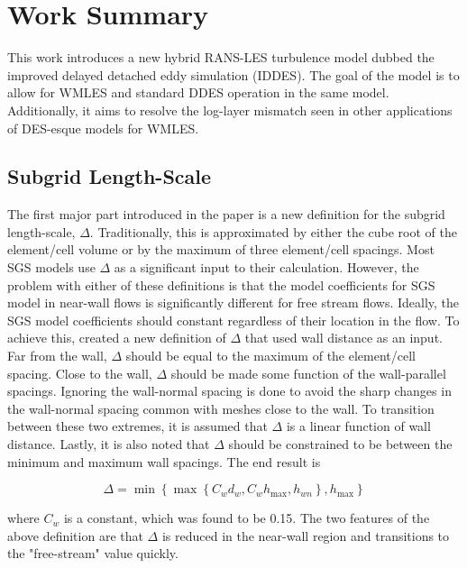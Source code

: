 \documentclass{ucb}
\begin{document}
\section{Work Summary}
This work introduces a new hybrid RANS-LES turbulence model dubbed the improved delayed detached eddy simulation (IDDES). The goal of the model is to allow for WMLES and standard DDES operation in the same model. Additionally, it aims to resolve the log-layer mismatch seen in other applications of DES-esque models for WMLES.

\subsection{Subgrid Length-Scale}
The first major part introduced in the paper is a new definition for the subgrid length-scale, \(\Delta \). Traditionally, this is approximated by either the cube root of the element/cell volume or by the maximum of three element/cell spacings. Most SGS models use \(\Delta \) as a significant input to their calculation. However, the problem with either of these definitions is that the model coefficients for SGS model in near-wall flows is significantly different for free stream flows. Ideally, the SGS model coefficients should constant regardless of their location in the flow. To achieve this, \citeauthor{shurHybridRANSLESApproach2008} created a new definition of \(\Delta \) that used wall distance as an input. Far from the wall, \(\Delta \) should be equal to the maximum of the element/cell spacing. Close to the wall, \(\Delta \) should be made some function of the wall-parallel spacings. Ignoring the wall-normal spacing is done to avoid the sharp changes in the wall-normal spacing common with meshes close to the wall. To transition between these two extremes, it is assumed that \(\Delta \) is a linear function of wall distance. Lastly, it is also noted that \(\Delta \) should be constrained to be between the minimum and maximum wall spacings. The end result is

\begin{equation}\label{eq:delta}
    \Delta = \min \left \{ 
        \max \left \{ C_w d_w, C_w h_{\max}, h_{wn}\right \} 
        , h_{\max} \right \}
\end{equation}

where \(C_w\) is a constant, which was found to be 0.15. 
The two features of the above definition are that \(\Delta \) is reduced in the near-wall region and transitions to the "free-stream" value quickly. 
\end{document}
